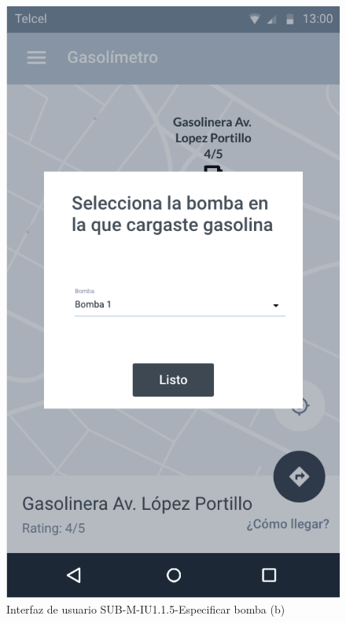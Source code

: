 \begin{figure}[H]
	\centering
	\includegraphics[scale=.55]{Capitulo4/software/submodulos/mediciones/images/sub-m-iu1_1_5_b}
	\caption{Interfaz de usuario SUB-M-IU1.1.5-Especificar bomba (b)}
	\label{fig:sub-m-iu1.1.5.b}
\end{figure}